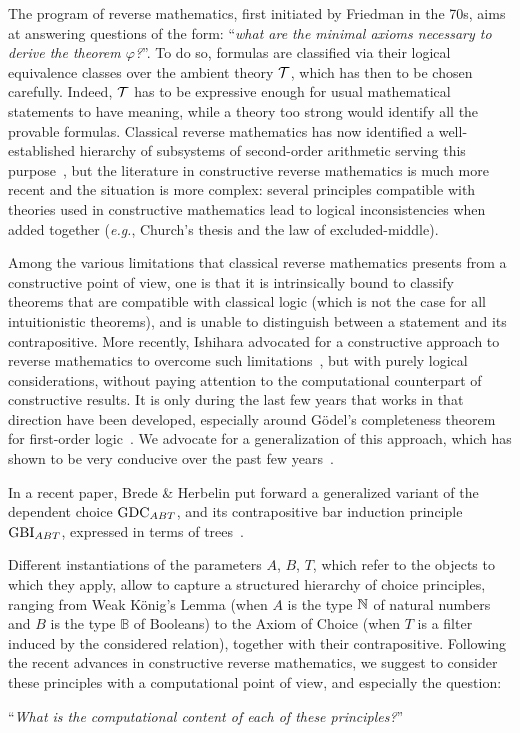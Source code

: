 \documentclass[a4paper,UKenglish,cleveref, autoref, thm-restate]{lipics-v2021}
\begin{document}
The program of reverse mathematics, first initiated by Friedman in the 70s,
aims at answering questions of the form: ``\emph{what are the minimal axioms necessary to derive the theorem $\varphi$?}''.
To do so, formulas are classified via their logical equivalence classes over the ambient theory $\mathcal T$, which has then to be chosen carefully.
Indeed, $\mathcal T$ has to be expressive enough for usual mathematical statements to have meaning, while a theory too strong would identify all the provable formulas. Classical reverse mathematics has now identified a well-established hierarchy of subsystems of second-order arithmetic serving this purpose~\cite{Simpson09}, but the literature in constructive reverse mathematics is much more recent and the situation is more complex: several principles compatible with theories used in constructive mathematics lead to logical inconsistencies when added together (\emph{e.g.}, Church’s thesis and the law of excluded-middle).







Among the various limitations that classical reverse mathematics presents
from a constructive point of view, one is that it is intrinsically
bound to classify theorems that are compatible with classical logic (which is not the case for all intuitionistic theorems), and is unable to distinguish between a statement and its contrapositive.
More recently, Ishihara advocated for a constructive approach to reverse
mathematics to overcome such limitations~\cite{Ishihara06}, but with
purely logical considerations, without paying attention to the computational counterpart of constructive results.
It is only during the last few years that works in that direction have been developed, especially around Gödel's completeness theorem for first-order logic~\cite{HerIli25,ForKirWeh21}.
We advocate for a generalization of this approach, which has shown to be very conducive over the past few years~\cite{KirZen25,CohEtAl24,HerKir24,Bauer22}.





In a recent paper, Brede \& Herbelin put forward a generalized variant of the dependent choice $\mathrm{GDC}_{ABT}$, and its contrapositive bar induction principle $\mathrm{GBI}_{ABT}$, expressed in terms of trees~\cite{BreHer21}.

Different instantiations of the parameters $A$, $B$, $T$, which refer to the objects to which they apply, allow to capture
a structured hierarchy of choice principles, ranging from Weak K\"onig's Lemma
(when $A$ is the type $\mathbb N$ of natural numbers and $B$ is the type $\mathbb{B}$ of Booleans)
to the Axiom of Choice
(when $T$ is a filter induced by the considered relation), together with their contrapositive.
Following the recent advances in constructive reverse mathematics, we suggest to consider these principles with a computational point of view, and especially the question:
\begin{center}
 ``\emph{What is the computational content of each of these principles?}''
\end{center}
\end{document}
